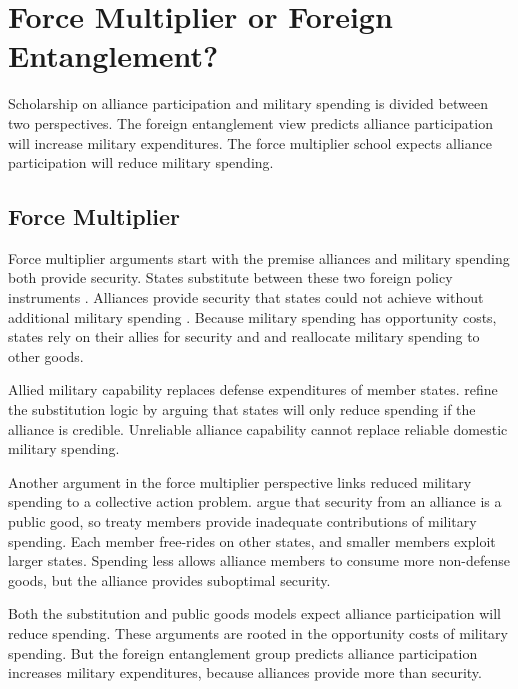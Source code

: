 \documentclass[12pt]{article}
\begin{document}
\section{Force Multiplier or Foreign Entanglement?}


Scholarship on alliance participation and military spending is divided between two perspectives. 
The foreign entanglement view predicts alliance participation will increase military expenditures.
The force multiplier school expects alliance participation will reduce military spending. 


\subsection{Force Multiplier} 


Force multiplier arguments start with the premise alliances and military spending both provide security.
States substitute between these two foreign policy instruments \citep{MostStarr1989}.  
Alliances provide security that states could not achieve without additional military spending \citep{Morrow1993, Conybeare1994}. 
Because military spending has opportunity costs, states rely on their allies for security and and reallocate military spending to other goods. 


Allied military capability replaces defense expenditures of member states. 
\citet{DigiuseppePoast2016} refine the substitution logic by arguing that states will only reduce spending if the alliance is credible. 
Unreliable alliance capability cannot replace reliable domestic military spending. 


Another argument in the force multiplier perspective links reduced military spending to a collective action problem. 
\citet{OlsonZeckhauser1966} argue that security from an alliance is a public good, so treaty members provide inadequate contributions of military spending. 
Each member free-rides on other states, and smaller members exploit larger states. 
Spending less allows alliance members to consume more non-defense goods, but the alliance provides suboptimal security. 


Both the substitution and public goods models expect alliance participation will reduce spending. 
These arguments are rooted in the opportunity costs of military spending. 
But the foreign entanglement group predicts alliance participation increases military expenditures, because alliances provide more than security. 
\end{document}

